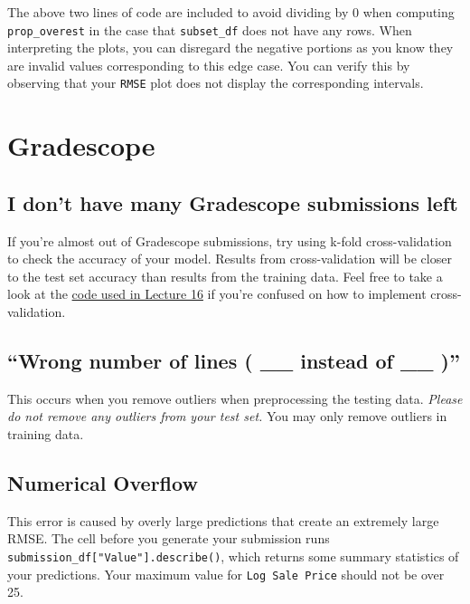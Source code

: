 \documentclass[
  letterpaper,
  DIV=11,
  numbers=noendperiod]{scrreprt}
\begin{document}
The above two lines of code are included to avoid dividing by 0 when
computing \texttt{prop\_overest} in the case that \texttt{subset\_df}
does not have any rows. When interpreting the plots, you can disregard
the negative portions as you know they are invalid values corresponding
to this edge case. You can verify this by observing that your
\texttt{RMSE} plot does not display the corresponding intervals.

\section{Gradescope}\label{gradescope-1}

\subsection{I don't have many Gradescope submissions
left}\label{i-dont-have-many-gradescope-submissions-left}

If you're almost out of Gradescope submissions, try using k-fold
cross-validation to check the accuracy of your model. Results from
cross-validation will be closer to the test set accuracy than results
from the training data. Feel free to take a look at the
\href{https://ds100.org/sp24/resources/assets/lectures/lec16/lec16.html}{code
used in Lecture 16} if you're confused on how to implement
cross-validation.

\subsection{``Wrong number of lines ( \_\_ instead of \_\_
)''}\label{wrong-number-of-lines-__-instead-of-__}

This occurs when you remove outliers when preprocessing the testing
data. \emph{Please do not remove any outliers from your test set.} You
may only remove outliers in training data.

\subsection{Numerical Overflow}\label{numerical-overflow}

This error is caused by overly large predictions that create an
extremely large RMSE. The cell before you generate your submission runs
\texttt{submission\_df{[}"Value"{]}.describe()}, which returns some
summary statistics of your predictions. Your maximum value for
\texttt{Log\ Sale\ Price} should not be over 25.
\end{document}
